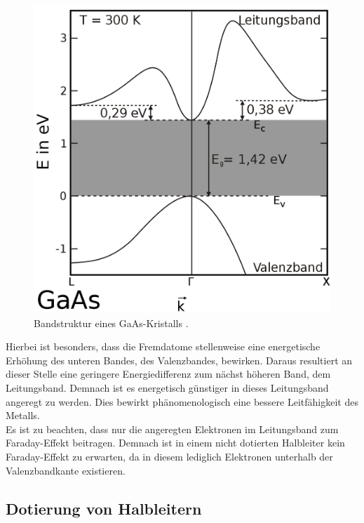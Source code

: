 \begin{figure}
    \centering
    \includegraphics[scale=0.2]{content/Bandstruktur.png}
    \caption{Bandstruktur eines GaAs-Kristalls \cite{Band}.}
    \label{fig:Band}
  \end{figure}

Hierbei ist besonders, dass die Fremdatome stellenweise eine energetische Erhöhung des unteren Bandes, des Valenzbandes, bewirken. Daraus resultiert 
an dieser Stelle eine geringere Energiedifferenz zum nächst höheren Band, dem Leitungsband. Demnach ist es energetisch günstiger in dieses Leitungsband 
angeregt zu werden. Dies bewirkt phänomenologisch eine bessere Leitfähigkeit des Metalls.\\
Es ist zu beachten, dass nur die angeregten Elektronen im Leitungsband zum Faraday-Effekt beitragen. Demnach ist in einem nicht dotierten Halbleiter 
kein Faraday-Effekt zu erwarten, da in diesem lediglich Elektronen unterhalb der Valenzbandkante existieren.

\subsection{Dotierung von Halbleitern}

